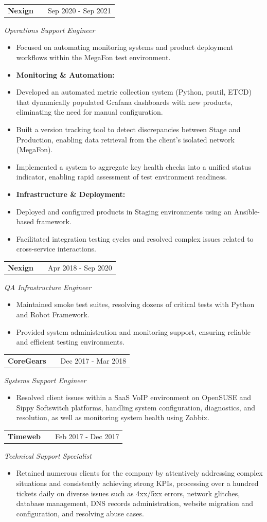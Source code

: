 \documentclass[a4paper,12pt]{article}
\makeatletter
\newenvironment{joblong}[3]
    {
    \begin{tabularx}{\linewidth}{@{}l X r@{}}
    \textbf{#1} & \hfill &  #2 \\[3.75pt]
    \end{tabularx}
    {\itshape #3}\par\vspace{2pt}
    \begin{itemize}[nosep,after=\strut, leftmargin=1em, itemsep=4pt,label=-]
    }
    {
    \end{itemize}
    }
\makeatother
\begin{document}
\begin{joblong}{Nexign}{Sep 2020 - Sep 2021}{Operations Support Engineer}
\item[] Focused on automating monitoring systems and product deployment workflows within the MegaFon test environment.
\item[] \textbf{Monitoring \& Automation:}
\item Developed an automated metric collection system (Python, psutil, ETCD) that dynamically populated Grafana dashboards with new products, eliminating the need for manual configuration.
\item Built a version tracking tool to detect discrepancies between Stage and Production, enabling data retrieval from the client’s isolated network (MegaFon).
\item Implemented a system to aggregate key health checks into a unified status indicator, enabling rapid assessment of test environment readiness.
\item[] \textbf{Infrastructure \& Deployment:}\smallskip
\item Deployed and configured products in Staging environments using an Ansible-based framework.
\item Facilitated integration testing cycles and resolved complex issues related to cross-service interactions.
\end{joblong}

\begin{joblong}{Nexign}{Apr 2018 - Sep 2020}{QA Infrastructure Engineer}
\item[] Maintained smoke test suites, resolving dozens of critical tests with Python and Robot Framework.
\item[] Provided system administration and monitoring support, ensuring reliable and efficient testing environments.
\end{joblong}

\begin{joblong}{CoreGears}{Dec 2017 - Mar 2018}{Systems Support Engineer}
\item[] Resolved client issues within a SaaS VoIP environment on OpenSUSE and Sippy Softswitch platforms, handling system configuration, diagnostics, and resolution, as well as monitoring system health using Zabbix.
\end{joblong}

\begin{joblong}{Timeweb}{Feb 2017 - Dec 2017}{Technical Support Specialist}
\item[] Retained numerous clients for the company by attentively addressing complex situations and consistently achieving strong KPIs, processing over a hundred tickets daily on diverse issues such as 4xx/5xx errors, network glitches, database management, DNS records administration, website migration and configuration, and resolving abuse cases.
\end{joblong}
\end{document}
